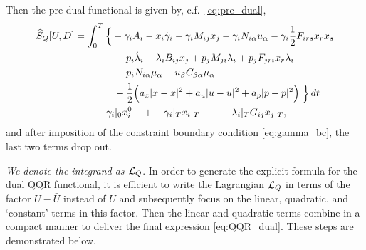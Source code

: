 \documentclass[11pt]{article}
\begin{document}
Then the pre-dual functional is given by, c.f.~\eqref{eq:pre_dual},
\begin{equation*}
    \begin{aligned}
        \widehat{S}_Q[U,D] & =  \int_0^T \Big\{ - \gamma_i A_i - x_i \dot{\gamma}_i - \gamma_i M_{ij} x_j - \gamma_i N_{i \alpha} u_\alpha - \gamma_i \frac{1}{2} F_{irs} x_r x_s \\
        & \qquad \qquad - p_i \dot{\lambda}_i - \lambda_i B_{ij} x_j + p_j M_{ji} \lambda_i + p_j F_{jri} x_r \lambda_i\\
        & \qquad \qquad +  p_i N_{i \alpha} \mu_\alpha -  u_\beta C_{\beta \alpha} \mu_\alpha\\
        & \qquad \qquad - \frac{1}{2} \Big( a_x |x - \bar{x}|^2 + a_u |u - \bar{u}|^2 + a_p |p - \bar{p}|^2 \Big) \ \Big\} \, dt\\
        & \qquad - \gamma_i|_0 x^0_i \quad + \quad \gamma_i|_T x_i|_T \quad - \quad \lambda_i|_T G_{ij} x_j|_T,
    \end{aligned}
\end{equation*}
and after imposition of the constraint boundary condition \eqref{eq:gamma_bc}, the last two terms drop out. 

\emph{We denote the integrand as $\mathcal{L}_Q$}. In order to generate the explicit formula for the dual QQR functional, it is efficient to write the Lagrangian $\mathcal{L}_Q$ in terms of the factor $U - \bar{U}$ instead of $U$ and subsequently focus on the linear, quadratic, and `constant' terms in this factor. Then the linear and quadratic terms combine in a compact manner to deliver the final expression \eqref{eq:QQR_dual}. These steps are demonstrated below.
\end{document}
